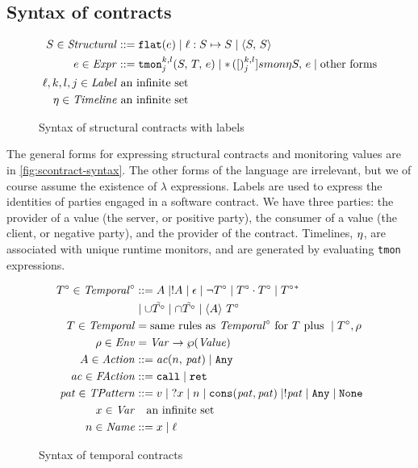 \subsection{Syntax of contracts}
\begin{figure}
  \begin{align*}
    S \in \mathit{Structural} &::= {\tt flat}(e) \mid \ell : S \mapsto S \mid \langle S,\, S\rangle
\\
    e \in \mathit{Expr} &::= {\tt tmon}{^{k,l}_{j}}({S,\,T,\,e})
                    \mid {\tt *}{\,}({[})^{k,l}_{j}]{smon}{\eta}{S,\, e}
                    \mid \text{other forms}
\\
\ell,k,l,j \in \mathit{Label}&\text{ an infinite set} \\
\eta \in \mathit{Timeline} &\text{ an infinite set}
  \end{align*}
  \caption{Syntax of structural contracts with labels}
  \label{fig:scontract-syntax}
\end{figure}

The general forms for expressing structural contracts and monitoring values are in \autoref{fig:scontract-syntax}.
%
The other forms of the language are irrelevant, but we of course assume the existence of $\lambda$ expressions.
%
Labels are used to express the identities of parties engaged in a software contract.
%
We have three parties: the provider of a value (the server, or positive party), the consumer of a value (the client, or negative party), and the provider of the contract.
%
Timelines, $\eta$, are associated with unique runtime monitors, and are generated by evaluating {\tt tmon} expressions.

\begin{figure}
  \begin{align*}
  T^\circ \in \mathit{Temporal}^\circ &::=
      A \mid ! A
 \mid \epsilon
 \mid \neg T^\circ
 \mid T^\circ \cdot T^\circ
 \mid T^\circ{}^* \\
&\mid \cup \tilde{T^\circ}
 \mid \cap \tilde{T^\circ}
 \mid \langle A\rangle\ T^\circ
\\
T \in \mathit{Temporal} &= \text{same rules as } \mathit{Temporal}^\circ \text{ for } T \text{ plus } \mid T^\circ, \rho \\
\rho \in \mathit{Env} &= \mathit{Var} \to \wp(\mathit{Value}) \\
A \in \mathit{Action} &::= \mathit{ac}(n,\, \mathit{pat}) \mid {\tt Any} \\
\mathit{ac} \in \mathit{FAction} &::= {\tt call} \mid {\tt ret} \\
\mathit{pat} \in \mathit{TPattern} &::= v \mid {\tt ?} x \mid n \mid {\tt cons}(\mathit{pat},\mathit{pat}) \mid ! \mathit{pat} \mid {\tt Any} \mid {\tt None} \\
x \in \mathit{Var} &\quad\text{an infinite set} \\
n \in \mathit{Name} &::= x \mid \ell
  \end{align*}
  \caption{Syntax of temporal contracts}
  \label{fig:tcontract-syntax}
\end{figure}

